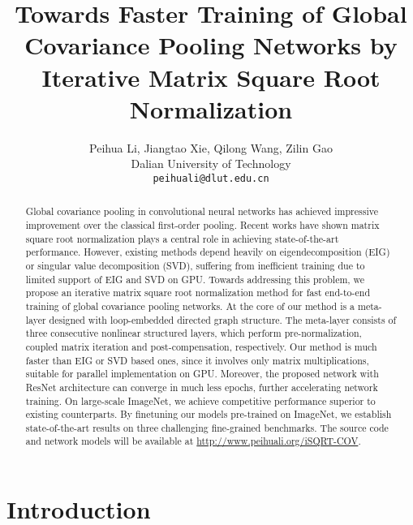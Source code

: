 \documentclass[10pt,twocolumn,letterpaper]{article}
\begin{document}
\title{Towards Faster Training of Global Covariance Pooling Networks by Iterative Matrix Square Root Normalization} 
\author{Peihua Li, Jiangtao Xie, Qilong Wang, Zilin Gao\\
	Dalian University of Technology\\
	{\tt\small peihuali@dlut.edu.cn}
}

\maketitle
\thispagestyle{empty}

\begin{abstract}
Global covariance pooling in convolutional neural networks  has achieved impressive improvement over the classical first-order pooling. Recent works have shown matrix square root normalization plays a central role in achieving state-of-the-art performance. However, existing methods depend heavily  on eigendecomposition (EIG)  or singular value decomposition (SVD), suffering from inefficient training due to limited support of EIG and SVD on  GPU. Towards addressing this problem, we propose an iterative matrix square root normalization method for fast end-to-end  training of global covariance pooling networks. At the core of our method is  a meta-layer  designed with loop-embedded directed graph structure. The meta-layer  consists of three consecutive nonlinear structured layers, which perform pre-normalization, coupled matrix  iteration and post-compensation, respectively. Our method is much faster than EIG or SVD based ones, since it involves only matrix multiplications, suitable for parallel implementation on GPU.  Moreover, the proposed network with ResNet architecture can converge in much less epochs, further accelerating network training. On large-scale ImageNet, we achieve competitive performance superior to existing counterparts. By  finetuning our models pre-trained on ImageNet, we establish  state-of-the-art results on three challenging fine-grained benchmarks. The  source code and network models will be available at  \href{http://www.peihuali.org/iSQRT-COV}{http://www.peihuali.org/iSQRT-COV}. 
\end{abstract}

\section{Introduction}
\end{document}
